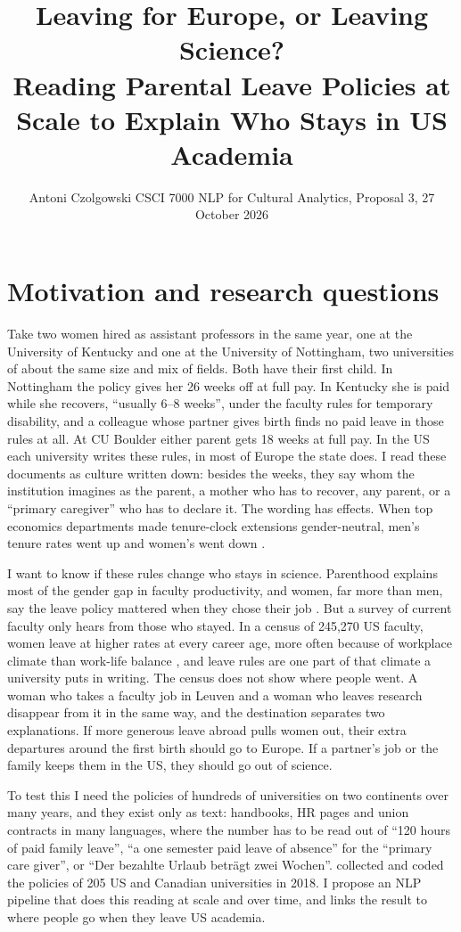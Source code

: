 \documentclass[10pt,twocolumn]{article}
\title{\vspace{-0.62in}\large\textbf{Leaving for Europe, or Leaving Science?}\\[2pt]\normalsize Reading Parental Leave Policies at Scale to Explain Who Stays in US Academia}
\author{\normalsize Antoni Czolgowski \quad CSCI 7000 NLP for Cultural Analytics, Proposal 3, 27 October 2026}
\date{\vspace{-0.32in}}
\begin{document}
\maketitle

\section{Motivation and research questions}
Take two women hired as assistant professors in the same year, one at the University of Kentucky and one at the University of Nottingham, two universities of about the same size and mix of fields. Both have their first child. In Nottingham the policy gives her 26 weeks off at full pay. In Kentucky she is paid while she recovers, ``usually 6--8 weeks'', under the faculty rules for temporary disability, and a colleague whose partner gives birth finds no paid leave in those rules at all. At CU Boulder either parent gets 18 weeks at full pay. In the US each university writes these rules, in most of Europe the state does. I read these documents as culture written down: besides the weeks, they say whom the institution imagines as the parent, a mother who has to recover, any parent, or a ``primary caregiver'' who has to declare it. The wording has effects. When top economics departments made tenure-clock extensions gender-neutral, men's tenure rates went up and women's went down \citep{antecol2018}.

I want to know if these rules change who stays in science. Parenthood explains most of the gender gap in faculty productivity, and women, far more than men, say the leave policy mattered when they chose their job \citep{morgan2021}. But a survey of current faculty only hears from those who stayed. In a census of 245,270 US faculty, women leave at higher rates at every career age, more often because of workplace climate than work-life balance \citep{spoon2023}, and leave rules are one part of that climate a university puts in writing. The census does not show where people went. A woman who takes a faculty job in Leuven and a woman who leaves research disappear from it in the same way, and the destination separates two explanations. If more generous leave abroad pulls women out, their extra departures around the first birth should go to Europe. If a partner's job or the family keeps them in the US, they should go out of science.

To test this I need the policies of hundreds of universities on two continents over many years, and they exist only as text: handbooks, HR pages and union contracts in many languages, where the number has to be read out of ``120 hours of paid family leave'', ``a one semester paid leave of absence'' for the ``primary care giver'', or ``Der bezahlte Urlaub beträgt zwei Wochen''. \citet{morgan2018} collected and coded the policies of 205 US and Canadian universities in 2018. I propose an NLP pipeline that does this reading at scale and over time, and links the result to where people go when they leave US academia.
\end{document}
